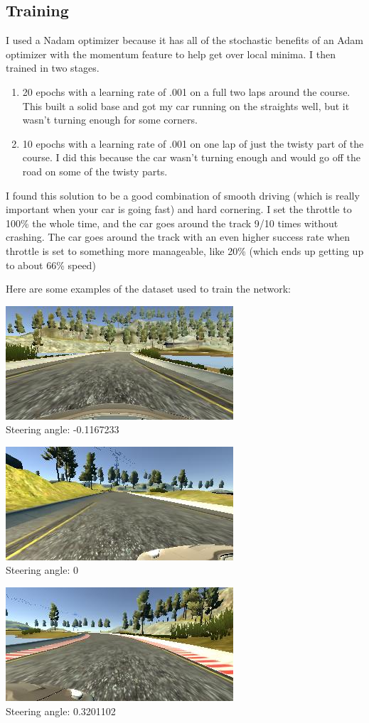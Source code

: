\documentclass[letterpaper,12pt]{article}
\begin{document}
\subsection*{Training}
I used a Nadam optimizer because it has all of the stochastic benefits of an Adam optimizer with the momentum feature to help get over local minima. I then trained in two stages.
\begin{enumerate}
\item 20 epochs with a learning rate of .001 on a full two laps around the course. This built a solid base and got my car running on the straights well, but it wasn't turning enough for some corners.

\item 10 epochs with a learning rate of .001 on one lap of just the twisty part of the course. I did this because the car wasn't turning enough and would go off the road on some of the twisty parts.
\end{enumerate}
I found this solution to be a good combination of smooth driving (which is really important when your car is going fast) and hard cornering. I set the throttle to 100\% the whole time, and the car goes around the track 9/10 times without crashing. The car goes around the track with an even higher success rate when throttle is set to something more manageable, like 20\% (which ends up getting up to about 66\% speed)

Here are some examples of the dataset used to train the network:

\includegraphics{sample_images/center_2016_12_01_13_32_58_012.jpg}\\
Steering angle: -0.1167233

\includegraphics{sample_images/left_2016_12_01_13_38_11_408.jpg}\\
Steering angle: 0

\includegraphics{sample_images/right_2016_12_01_13_45_55_778.jpg}\\
Steering angle: 0.3201102
\end{document}
